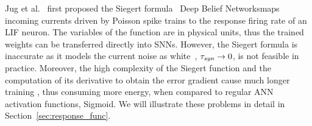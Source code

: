 	Jug et al.~\citep{Jug_etal_2012} first proposed the \DIFdelbegin {}\DIFdelend Siegert formula~\citep{siegert1951first} \DIFdelbegin {}\DIFdelend \DIFaddbegin {}\DIFaddend Deep Belief Networks\DIFdelbegin {}\DIFdelend \DIFaddbegin {}\DIFaddend maps incoming currents driven by Poisson spike trains to the response firing rate of an LIF neuron\DIFaddbegin {}\DIFaddend .
	The variables of the \DIFdelbegin {}\DIFdelend \DIFaddbegin {}\DIFaddend function are in physical units, thus the trained weights can be transferred directly into SNNs.
	However, the Siegert formula is inaccurate as it models the current noise as white~\citep{liu2016noisy}, $\tau_{\textit{\textrm{syn}}} \to 0$, \DIFdelbegin {}\DIFdelend \DIFaddbegin {}\DIFaddend is not feasible in practice.
	Moreover, the high complexity of the Siegert function and the computation of its derivative to obtain the error gradient cause much longer training \DIFdelbegin {}\DIFdelend \DIFaddbegin {}\DIFaddend , thus consuming more energy, when compared to regular ANN activation functions, \DIFdelbegin {}\DIFdelend \DIFaddbegin {}\DIFaddend Sigmoid.
	We will illustrate these problems in detail in Section~\ref{sec:response_func}. %

